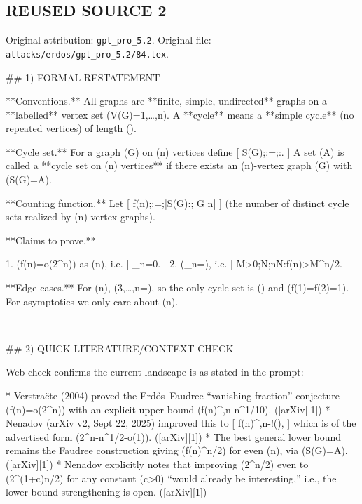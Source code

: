 
\subsection*{REUSED SOURCE 2}
Original attribution: \texttt{gpt\_pro\_5.2}.
Original file: \texttt{attacks/erdos/gpt\_pro\_5.2/84.tex}.

## 1) FORMAL RESTATEMENT

**Conventions.**
All graphs are **finite, simple, undirected** graphs on a **labelled** vertex set (V(G)={1,\dots,n}).
A **cycle** means a **simple cycle** (no repeated vertices) of length (\ell{}).

**Cycle set.** For a graph (G) on (n) vertices define
[
S(G);:=;{\ell{}:}.
]
A set (A) is called a **cycle set on (n) vertices** if there exists an (n)-vertex graph (G) with (S(G)=A).

**Counting function.** Let
[
f(n);:=;\bigl|{S(G):; G n}\bigr|
]
(the number of distinct cycle sets realized by (n)-vertex graphs).

**Claims to prove.**

1. (f(n)=o(2^n)) as (n\to\infty), i.e.
   [
   \lim_{n\to\infty}=0.
   ]
2. (\displaystyle \lim_{n\to\infty}=\infty), i.e.
   [
   \forall M>0;\exists N;\forall n\ge N:\quad f(n)>M^{n/2}.
   ]

**Edge cases.** For (n), ({3,\dots,n}=\emptyset), so the only cycle set is (\emptyset) and (f(1)=f(2)=1). For asymptotics we only care about (n\to\infty).

---

## 2) QUICK LITERATURE/CONTEXT CHECK

Web check confirms the current landscape is as stated in the prompt:

* Verstraëte (2004) proved the Erdős–Faudree “vanishing fraction” conjecture (f(n)=o(2^n)) with an explicit upper bound (f(n)^{,n-n^{1/10}}). ([arXiv][1])
* Nenadov (arXiv v2, Sept 22, 2025) improved this to
  [
  f(n)^{,n-\Omega!\Bigl(\Bigr)},
  ]
  which is of the advertised form (2^{n-n^{1/2-o(1)}}). ([arXiv][1])
* The best general lower bound remains the Faudree construction giving (f(n)^{n/2}) for even (n), via (S(G)=A). ([arXiv][1])
* Nenadov explicitly notes that improving (2^{n/2}) even to (2^{(1+c)n/2}) for any constant (c>0) “would already be interesting,” i.e., the lower-bound strengthening is open. ([arXiv][1])


